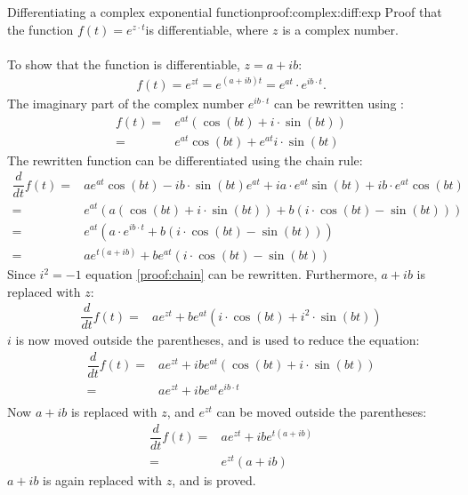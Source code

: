 \begin{prof}{Differentiating a complex exponential function}{proof:complex:diff:exp}
Proof that the function $f(t)=e^{z\cdot t}$is differentiable, where $z$ is a complex number.
\\ \\
To show that the function is differentiable, $z=a+ ib$:
\begin{align*}
	f(t) = e^{zt}= e^{(a+ib)t}= e^{at} \cdot e^{ib\cdot t}.
\end{align*}
The imaginary part of the complex number $e^{ib\cdot t}$ can be rewritten using :
\begin{align*}
	f(t) =& e^{at}\left(\cos(bt)+i \cdot \sin(bt)\right) \\
		 =& e^{at}\cos(bt) + e^{at} i \cdot \sin(bt)
\end{align*}
The rewritten function can be differentiated using the chain rule:
\begin{align}
	\dfrac{d}{dt}f(t) =& ae^{at}\cos(bt) -ib \cdot \sin(bt)e^{at} + ia \cdot e^{at}\sin(bt) + ib \cdot e^{at}\cos(bt) \nonumber \\
	=& e^{at} \left( a(\cos(bt) + i \cdot \sin(bt)) + b(i \cdot \cos(bt) - \sin(bt)) \right) \nonumber \\
	=& e^{at}(a \cdot e^{ib \cdot t}+b(i \cdot \cos(bt) - \sin(bt))) \nonumber \\
	=& a e^{t(a+ib)} + b e^{at}(i \cdot \cos(bt) - \sin(bt)) \label{proof:chain}
\end{align}
Since $i^2 = -1$ equation \eqref{proof:chain} can be rewritten. Furthermore, $a+ib$ is replaced with $z$:
\begin{align*}
	\dfrac{d}{dt}f(t) =& a e^{zt} + b e^{at}(i \cdot \cos(bt) + i^2 \cdot \sin(bt))
\end{align*}
$i$ is now moved outside the parentheses, and  is used to reduce the equation:
\begin{align*}
	\dfrac{d}{dt}f(t) =&  a e^{zt} + ib e^{at}(\cos(bt) + i \cdot \sin(bt)) \\
	=&  a e^{zt} + ib e^{at}e^{ib \cdot t} \\
\end{align*}
Now $a+ib$ is replaced with $z$, and $e^{zt}$ can be moved outside the parentheses:
\begin{align*}
	\dfrac{d}{dt}f(t) =&  a e^{zt} + ib e^{t(a+ib)} \\
	=&  e^{zt}(a+ib)
\end{align*}
$a+ib$ is again replaced with $z$, and  is proved.
\end{prof}
